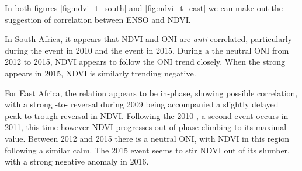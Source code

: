 In both figures \ref{fig:ndvi_t_south} and \ref{fig:ndvi_t_east} we
can make out the suggestion of correlation between ENSO and NDVI.

In South Africa, it appears that NDVI and ONI are
\emph{anti}-correlated, particularly during the \nina{} event in 2010
and the \elnino{} event in 2015. During a the neutral ONI from 2012 to
2015, NDVI appears to follow the ONI trend closely. When the strong
\elnino{} appears in 2015, NDVI is similarly trending negative.

For East Africa, the relation appears to be in-phase, showing possible
correlation, with a strong \elnino{}-to-\nina{} reversal during 2009
being accompanied a slightly delayed peak-to-trough reversal in
NDVI. Following the 2010 \nina{}, a second \nina{} event occurs in
2011, this time however NDVI progresses out-of-phase climbing to its
maximal value. Between 2012 and 2015 there is a neutral ONI, with NDVI
in this region following a similar calm. The 2015 \elnino{} event
seems to stir NDVI out of its slumber, with a strong negative anomaly
in 2016.

